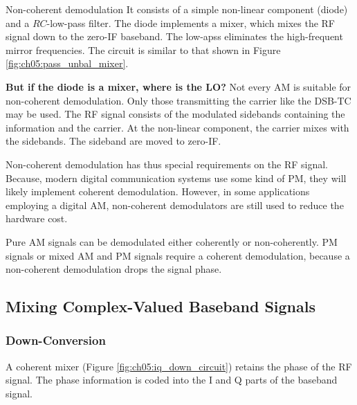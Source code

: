 \begin{refsection}
\begin{excursus}{Non-coherent demodulation}
	It consists of a simple non-linear component (diode) and a $RC$-low-pass filter. The diode implements a mixer, which mixes the \ac{RF} signal down to the zero-\acs{IF} baseband. The low-apss eliminates the high-frequent mirror frequencies. The circuit is similar to that shown in Figure \ref{fig:ch05:pass_unbal_mixer}.
	
	\vspace{0.5em}
	
	\textbf{But if the diode is a mixer, where is the \ac{LO}?} Not every \ac{AM} is suitable for non-coherent demodulation. Only those transmitting the carrier like the \ac{DSB-TC} may be used. The \ac{RF} signal consists of the modulated sidebands containing the information and the carrier. At the non-linear component, the carrier mixes with the sidebands. The sideband are moved to zero-\ac{IF}.
	
	\vspace{0.5em}
	
	Non-coherent demodulation has thus special requirements on the \ac{RF} signal. Because, modern digital communication systems use some kind of \ac{PM}, they will likely implement coherent demodulation. However, in some applications employing a digital \ac{AM}, non-coherent demodulators are still used to reduce the hardware cost.
\end{excursus}

\begin{fact}
	Pure \ac{AM} signals can be demodulated either coherently or non-coherently. \ac{PM} signals or mixed \ac{AM} and \ac{PM} signals require a coherent demodulation, because a non-coherent demodulation drops the signal phase.
\end{fact}

\subsection{Mixing Complex-Valued Baseband Signals}

\subsubsection{Down-Conversion}

A coherent mixer (Figure \ref{fig:ch05:iq_down_circuit}) retains the phase of the \ac{RF} signal. The phase information is coded into the \ac{I} and \ac{Q} parts of the baseband signal.


\end{refsection}
